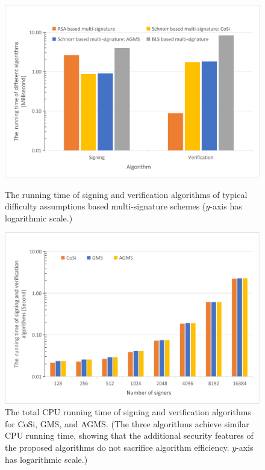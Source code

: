 \documentclass[journal]{IEEEtran}
\begin{document}
\begin{figure}[htbp]
\begin{minipage}[t]{0.45\linewidth}
\centering
\includegraphics[width=\textwidth]{FigA2.jpg}
\caption{The running time of signing and verification algorithms of typical difficulty assumptions based multi-signature schemes ($y$-axis has logarithmic scale.)}
\label{figassumption}
\end{minipage}%
\hfill
\begin{minipage}[t]{0.45\linewidth}
\centering
\includegraphics[width=\textwidth]{Fig3.jpg}
\caption{The total CPU running time of signing and verification algorithms for CoSi, GMS, and AGMS. (The three algorithms achieve similar CPU running time, showing that the additional security features of the proposed algorithms do not sacrifice algorithm efficiency. $y$-axis has logarithmic scale.)} \label{fig3}
\end{minipage}%
\end{figure}
\end{document}
